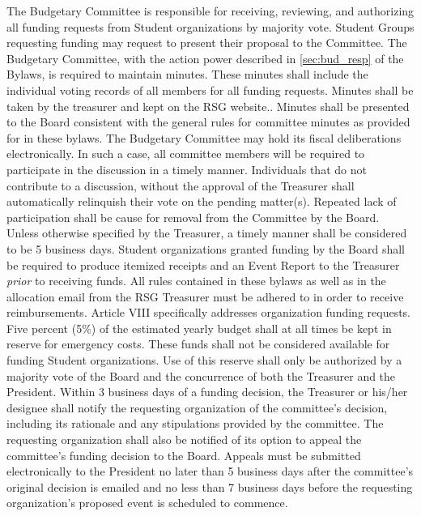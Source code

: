 \begin{enumsubsection}
\begin{enumsubsubsection}
\itemnotoc\label{sec:bud_resp} The Budgetary Committee is responsible for receiving, reviewing, and 
authorizing all funding requests from Student organizations by majority 
vote. Student Groups requesting funding may request to present their 
proposal to the Committee.
\itemnotoc The Budgetary Committee, with the action power described in \ref{sec:bud_resp} of the Bylaws, is required to maintain minutes. These minutes shall 
include the individual voting records of all members for all funding 
requests. Minutes shall be taken by the treasurer and kept on the RSG 
website.. Minutes shall be presented to the Board consistent with the 
general rules for committee minutes as provided for in these bylaws.
\itemnotoc The Budgetary Committee may hold its fiscal deliberations 
electronically. In such a case, all committee members will be required to 
participate in the discussion in a timely manner. Individuals that do not 
contribute to a discussion, without the approval of the Treasurer shall 
automatically relinquish their vote on the pending matter(s). Repeated 
lack of participation shall be cause for removal from the Committee by 
the Board. Unless otherwise specified by the Treasurer, a timely manner 
shall be considered to be 5 business days. 
\itemnotoc Student organizations granted funding by the Board shall be required 
to produce itemized receipts and an Event Report to the Treasurer 
\emph{prior} to receiving funds. 
\itemnotoc All rules contained in these bylaws as well as in the allocation email 
from the RSG Treasurer must be adhered to in order to receive 
reimbursements. Article VIII specifically addresses organization 
funding requests.
\itemnotoc Five percent (5\%) of the estimated yearly budget shall at all times be 
kept in reserve for emergency costs. These funds shall not be 
considered available for funding Student organizations. Use of this 
reserve shall only be authorized by a majority vote of the Board and 
the concurrence of both the Treasurer and the President. 
\itemnotoc Within 3 business days of a funding decision, the Treasurer or his/her 
designee shall notify the requesting organization of the committee's 
decision, including its rationale and any stipulations provided by the 
committee. The requesting organization shall also be notified of its 
option to appeal the committee's funding decision to the Board. 
Appeals must be submitted electronically to the President no later than 
5 business days after the committee's original decision is emailed and 
no less than 7 business days before the requesting organization's 
proposed event is scheduled to commence. 

\end{enumsubsubsection}
\end{enumsubsection}
